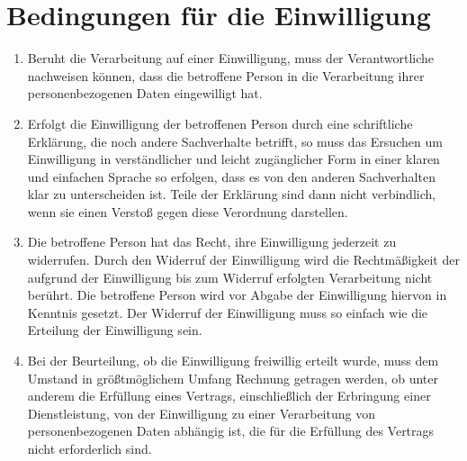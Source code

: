 \chapter{Bedingungen für die Einwilligung}
\label{ch:7}


\begin{enumerate}

  \item Beruht die Verarbeitung auf einer Einwilligung, muss der Verantwortliche nachweisen können, dass die betroffene
   Person in die Verarbeitung ihrer personenbezogenen Daten eingewilligt hat.
  \label{itm:07-1}

  \item Erfolgt die Einwilligung der betroffenen Person durch eine schriftliche Erklärung, die noch andere Sachverhalte
   betrifft, so muss das Ersuchen um Einwilligung in verständlicher und leicht zugänglicher Form in einer klaren und
   einfachen Sprache so erfolgen, dass es von den anderen Sachverhalten klar zu unterscheiden ist. Teile der Erklärung
   sind dann nicht verbindlich, wenn sie einen Verstoß gegen diese Verordnung darstellen.
  \label{itm:07-2}

  \item Die betroffene Person hat das Recht, ihre Einwilligung jederzeit zu widerrufen. Durch den Widerruf der
   Einwilligung wird die Rechtmäßigkeit der aufgrund der Einwilligung bis zum Widerruf erfolgten Verarbeitung nicht
   berührt. Die betroffene Person wird vor Abgabe der Einwilligung hiervon in Kenntnis gesetzt. Der Widerruf der
   Einwilligung muss so einfach wie die Erteilung der Einwilligung sein.
  \label{itm:07-3}

  \item Bei der Beurteilung, ob die Einwilligung freiwillig erteilt wurde, muss dem Umstand in größtmöglichem Umfang
   Rechnung getragen werden, ob unter anderem die Erfüllung eines Vertrags, einschließlich der Erbringung einer
   Dienstleistung, von der Einwilligung zu einer Verarbeitung von personenbezogenen Daten abhängig ist, die für die
   Erfüllung des Vertrags nicht erforderlich sind.
  \label{itm:07-4}

\end{enumerate}


